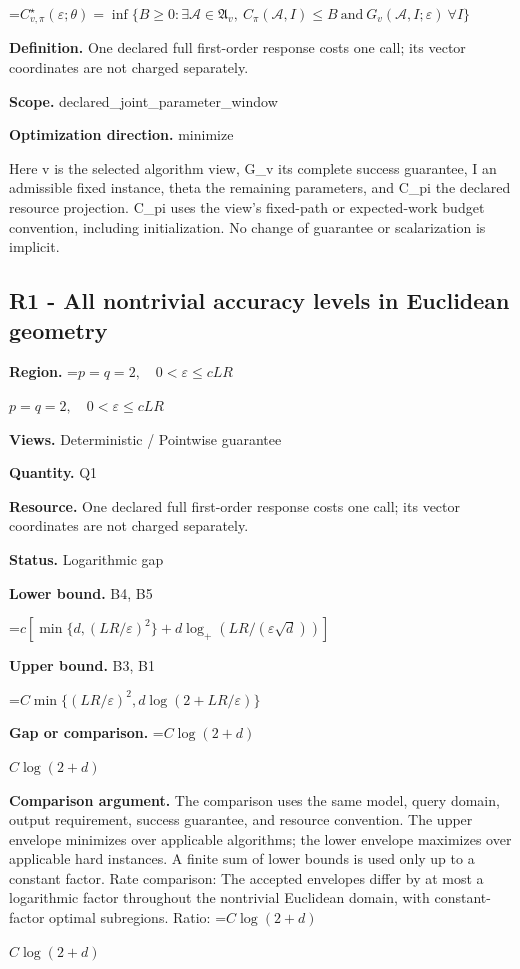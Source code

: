 \documentclass[10pt,a4paper]{article}
\newcommand{\AtlasMath}[1]{\par\begingroup\centering\setbox0=\hbox{$\displaystyle #1$}\ifdim\wd0>1.4\linewidth\typeout{ATLAS WIDE FORMULA: \the\wd0}\fi\ifdim\wd0>\linewidth\resizebox{\linewidth}{!}{\box0}\else\box0\fi\par\endgroup}
\newcommand{\AtlasInlineMath}[1]{\begingroup\setbox0=\hbox{$#1$}\ifdim\wd0>.4\linewidth\endgroup\AtlasMath{#1}\else\endgroup$#1$\fi}
\begin{document}
\AtlasMath{C^\star_{v,\pi}(\varepsilon;\theta)=\inf\{B\ge0:\exists\mathcal A\in\mathfrak A_v,\ C_\pi(\mathcal A,I)\le B\ \text{and}\ G_v(\mathcal A,I;\varepsilon)\ \forall I\}}
\textbf{Definition.} One declared full first-order response costs one call; its vector coordinates are not charged separately.

\textbf{Scope.} declared\_joint\_parameter\_window

\textbf{Optimization direction.} minimize

Here v is the selected algorithm view, G\_v its complete success guarantee, I an admissible fixed instance, theta the remaining parameters, and C\_pi the declared resource projection. C\_pi uses the view's fixed-path or expected-work budget convention, including initialization. No change of guarantee or scalarization is implicit.

\subsection{R1 - All nontrivial accuracy levels in Euclidean geometry}
\textbf{Region.} \AtlasInlineMath{p=q=2,\quad0<\varepsilon\le cLR}

\textbf{Views.} Deterministic / Pointwise guarantee

\textbf{Quantity.} Q1

\textbf{Resource.} One declared full first-order response costs one call; its vector coordinates are not charged separately.

\textbf{Status.} Logarithmic gap

\textbf{Lower bound.} B4, B5

\AtlasMath{c[\min\{d,(LR/\varepsilon)^2\}+d\log_+(LR/(\varepsilon\sqrt d))]}
\textbf{Upper bound.} B3, B1

\AtlasMath{C\min\{(LR/\varepsilon)^2,d\log(2+LR/\varepsilon)\}}
\textbf{Gap or comparison.} \AtlasInlineMath{C\log(2+d)}

\textbf{Comparison argument.} The comparison uses the same model, query domain, output requirement, success guarantee, and resource convention. The upper envelope minimizes over applicable algorithms; the lower envelope maximizes over applicable hard instances. A finite sum of lower bounds is used only up to a constant factor. Rate comparison: The accepted envelopes differ by at most a logarithmic factor throughout the nontrivial Euclidean domain, with constant-factor optimal subregions. Ratio: \AtlasInlineMath{C\log(2+d)}
\end{document}
